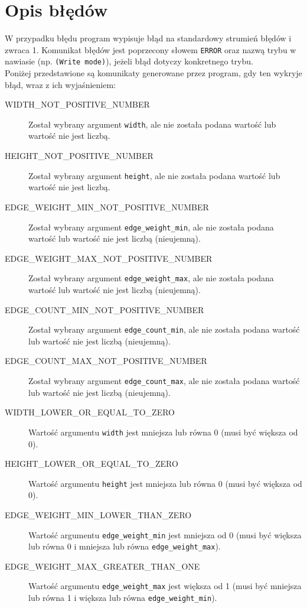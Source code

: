 \documentclass[11pt,a4paper]{report}
\begin{document}
    \section{Opis błędów}
    W przypadku błędu program wypisuje błąd na standardowy strumień błędów i zwraca 1. Komunikat błędów jest poprzecony słowem \verb|ERROR| oraz nazwą trybu w nawiasie (np. \verb|(Write mode)|), jeżeli błąd dotyczy konkretnego trybu.\\
    Poniżej przedstawione są komunikaty generowane przez program, gdy ten wykryje błąd, wraz z ich wyjaśnieniem:\\
    \begin{description}
        \item[WIDTH\_NOT\_POSITIVE\_NUMBER] Został wybrany argument \verb|width|, ale nie została podana wartość lub wartość nie jest liczbą.
        \item[HEIGHT\_NOT\_POSITIVE\_NUMBER] Został wybrany argument \verb|height|, ale nie została podana wartość lub wartość nie jest liczbą.
        \item[EDGE\_WEIGHT\_MIN\_NOT\_POSITIVE\_NUMBER] Został wybrany argument \verb|edge_weight_min|, ale nie została podana wartość lub wartość nie jest liczbą (nieujemną).
        \item[EDGE\_WEIGHT\_MAX\_NOT\_POSITIVE\_NUMBER] Został wybrany argument \verb|edge_weight_max|, ale nie została podana wartość lub wartość nie jest liczbą (nieujemną).
        \item[EDGE\_COUNT\_MIN\_NOT\_POSITIVE\_NUMBER] Został wybrany argument \verb|edge_count_min|, ale nie została podana wartość lub wartość nie jest liczbą (nieujemną).
        \item[EDGE\_COUNT\_MAX\_NOT\_POSITIVE\_NUMBER] Został wybrany argument \verb|edge_count_max|, ale nie została podana wartość lub wartość nie jest liczbą (nieujemną).
        \item[WIDTH\_LOWER\_OR\_EQUAL\_TO\_ZERO] Wartość argumentu \verb|width| jest mniejsza lub równa 0 (musi być większa od 0).
        \item[HEIGHT\_LOWER\_OR\_EQUAL\_TO\_ZERO] Wartość argumentu \verb|height| jest mniejsza lub równa 0 (musi być większa od 0).
        \item[EDGE\_WEIGHT\_MIN\_LOWER\_THAN\_ZERO] Wartość argumentu \verb|edge_weight_min| jest mniejsza od 0 (musi być większa lub równa 0 i mniejsza lub równa \verb|edge_weight_max|).
        \item[EDGE\_WEIGHT\_MAX\_GREATER\_THAN\_ONE] Wartość argumentu \verb|edge_weight_max| jest większa od 1 (musi być mniejsza lub równa 1 i większa lub równa \verb|edge_weight_min|).

\end{description}
\end{document}
